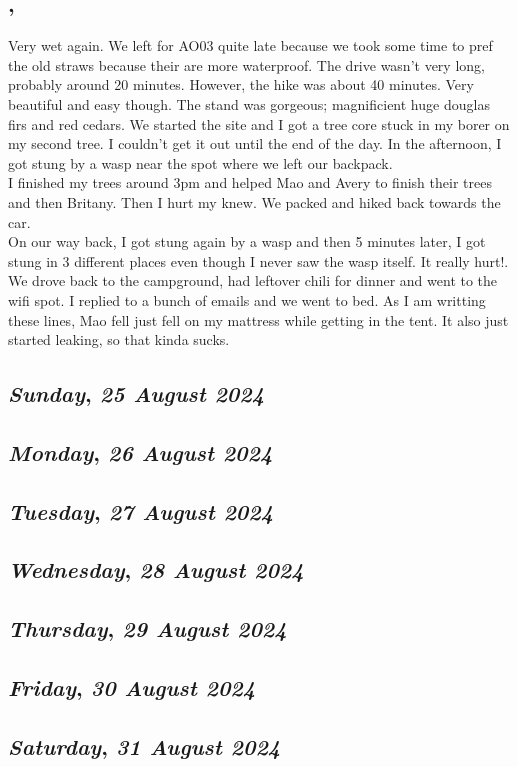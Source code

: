 \subsection*{\weekday, \day}
Very wet again. We left for AO03 quite late because we took some time to pref the old straws because their are more waterproof. The drive wasn't very long, probably around 20 minutes. However, the hike was about 40 minutes. Very beautiful and easy though. The stand was gorgeous; magnificient huge douglas firs and red cedars. We started the site and I got a tree core stuck in my borer on my second tree. I couldn't get it out until the end of the day. In the afternoon, I got stung by a wasp near the spot where we left our backpack.\\
I finished my trees around 3pm and helped Mao and Avery to finish their trees and then Britany. Then I hurt my knew. We packed and hiked back towards the car. \\
On our way back, I got stung again by a wasp and then 5 minutes later, I got stung in 3 different places even though I never saw the wasp itself. It really hurt!. \\
We drove back to the campground, had leftover chili for dinner and went to the wifi spot. I replied to a bunch of emails and we went to bed. As I am writting these lines, Mao fell just fell on my mattress while getting in the tent. It also just started leaking, so that kinda sucks.

\def\day{\textit{25 August 2024}}
\def\weekday{\textit{Sunday}}
\subsection*{\weekday, \day}

\def\day{\textit{26 August 2024}}
\def\weekday{\textit{Monday}}
\subsection*{\weekday, \day}

\def\day{\textit{27 August 2024}}
\def\weekday{\textit{Tuesday}}
\subsection*{\weekday, \day}

\def\day{\textit{28 August 2024}}
\def\weekday{\textit{Wednesday}}
\subsection*{\weekday, \day}

\def\day{\textit{29 August 2024}}
\def\weekday{\textit{Thursday}}
\subsection*{\weekday, \day}

\def\day{\textit{30 August 2024}}
\def\weekday{\textit{Friday}}
\subsection*{\weekday, \day}

\def\day{\textit{31 August 2024}}
\def\weekday{\textit{Saturday}}
\subsection*{\weekday, \day}
